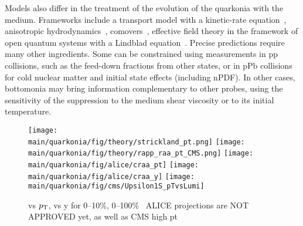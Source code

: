 \documentclass[../report.tex]{subfiles}
\providecommand{\main}{..}
\begin{document}
Models also differ in the treatment of the evolution of the quarkonia with the medium. Frameworks include a transport model with a kinetic-rate equation~\cite{Du:2017qkv},
anisotropic hydrodynamics~\cite{Krouppa:2017jlg}, comovers~\cite{Ferreiro:2018wbd}, effective field theory in the framework of open quantum systems with 
a Lindblad equation~\cite{Brambilla:2017zei}. Precise predictions require many other ingredients. Some can be constrained using measurements in pp collisions, such as
the feed-down fractions from other states, or in pPb collisions for cold nuclear matter and initial state effects (including nPDF). In other cases, bottomonia may bring information
complementary to other probes, using the sensitivity of the suppression to the medium shear viscosity or to its initial temperature.

\begin{figure}
\begin{center}
 \texttt{[image: \\main/quarkonia/fig/theory/strickland\_pt.png]}
 \texttt{[image: \\main/quarkonia/fig/theory/rapp\_raa\_pt\_CMS.png]}
 \texttt{[image: \\main/quarkonia/fig/alice/craa\_pt]}
 \texttt{[image: \\main/quarkonia/fig/alice/craa\_y]}
 \texttt{[image: \\main/quarkonia/fig/cms/Upsilon1S\_pTvsLumi]}
\end{center}

 \caption{\raa vs $p_{\rm T}$, \raa vs y for 0--10\%, 0--100\%~\cite{Krouppa:2017jlg,Du:2017qkv} ALICE projections are NOT APPROVED yet, as well as CMS high pt
 }
 \label{fig:upsi_raa_pt_y}
\end{figure}
\end{document}
